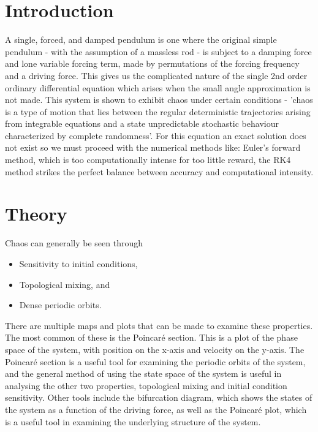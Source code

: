 \documentclass[11pt]{article} %
\begin{document}
\section{Introduction} 
\label{intro}

A single, forced, and damped pendulum is one where the original simple pendulum - with the assumption of a massless rod - is subject to a damping force and lone variable forcing term, made by permutations of the forcing frequency and a driving force. This gives  us the complicated nature of the single 2nd order ordinary differential equation which arises when the small angle approximation is not made. This system is shown to exhibit chaos under certain conditions - 'chaos is a type of motion that lies between the regular deterministic trajectories arising from integrable equations and a state unpredictable stochastic behaviour characterized by complete randomness'\cite{goldstein2002classical}. For this equation an exact solution does not exist so we must proceed with the numerical methods like: Euler's forward method, which is too computationally intense for too little reward, the RK4 method strikes the perfect balance between accuracy and computational intensity.
\section{Theory}
    Chaos can generally be seen through
    \begin{itemize}
        \item Sensitivity to initial conditions,
        \item Topological mixing, and
        \item Dense periodic orbits.
    \end{itemize}
    There are multiple maps and plots that can be made to examine these properties. 
    The most common of these is the Poincar\'e section. This is a plot of the phase 
    space of the system, with position on the x-axis and velocity 
    on the y-axis. The Poincar\'e section is a useful tool for examining the periodic 
    orbits of the system, and the general method of using the state space of the system 
    is useful in analysing the other two properties, topological mixing and initial condition
    sensitivity. Other tools include the bifurcation diagram, which shows the states of the
    system as a function of the driving force, as well as the Poincar\'e plot, which is a useful
    tool in examining the underlying structure of the system. \cite{Strogatz2000}\\
\end{document}
